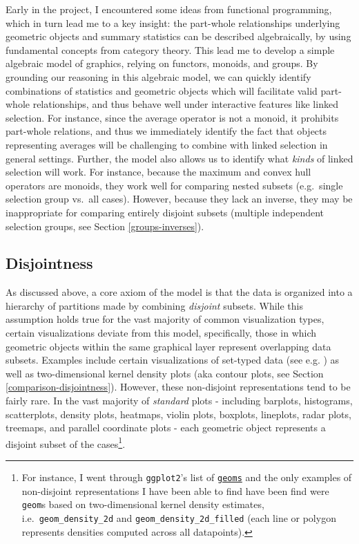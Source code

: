 \documentclass[
  openany]{book}
\theoremstyle{definition}
\theoremstyle{definition}
\theoremstyle{definition}
\theoremstyle{definition}
\theoremstyle{remark}
\begin{document}
Early in the project, I encountered some ideas from functional programming, which in turn lead me to a key insight: the part-whole relationships underlying geometric objects and summary statistics can be described algebraically, by using fundamental concepts from category theory. This lead me to develop a simple algebraic model of graphics, relying on functors, monoids, and groups. By grounding our reasoning in this algebraic model, we can quickly identify combinations of statistics and geometric objects which will facilitate valid part-whole relationships, and thus behave well under interactive features like linked selection. For instance, since the average operator is not a monoid, it prohibits part-whole relations, and thus we immediately identify the fact that objects representing averages will be challenging to combine with linked selection in general settings. Further, the model also allows us to identify what \emph{kinds} of linked selection will work. For instance, because the maximum and convex hull operators are monoids, they work well for comparing nested subsets (e.g.~single selection group vs.~all cases). However, because they lack an inverse, they may be inappropriate for comparing entirely disjoint subsets (multiple independent selection groups, see Section \ref{groups-inverses}).

\subsection{Disjointness}\label{disjointness}

As discussed above, a core axiom of the model is that the data is organized into a hierarchy of partitions made by combining \emph{disjoint} subsets. While this assumption holds true for the vast majority of common visualization types, certain visualizations deviate from this model, specifically, those in which geometric objects within the same graphical layer represent overlapping data subsets. Examples include certain visualizations of set-typed data (see e.g. ) as well as two-dimensional kernel density plots (aka contour plots, see Section \ref{comparison-disjointness}). However, these non-disjoint representations tend to be fairly rare. In the vast majority of \emph{standard} plots - including barplots, histograms, scatterplots, density plots, heatmaps, violin plots, boxplots, lineplots, radar plots, treemaps, and parallel coordinate plots - each geometric object represents a disjoint subset of the cases\footnote{For instance, I went through \texttt{ggplot2}'s list of \href{https://ggplot2.tidyverse.org/reference/}{\texttt{geoms}} and the only examples of non-disjoint representations I have been able to find have been find were \texttt{geom}s based on two-dimensional kernel density estimates, i.e.~\texttt{geom\_density\_2d} and \texttt{geom\_density\_2d\_filled} (each line or polygon represents densities computed across all datapoints).}.
\end{document}
